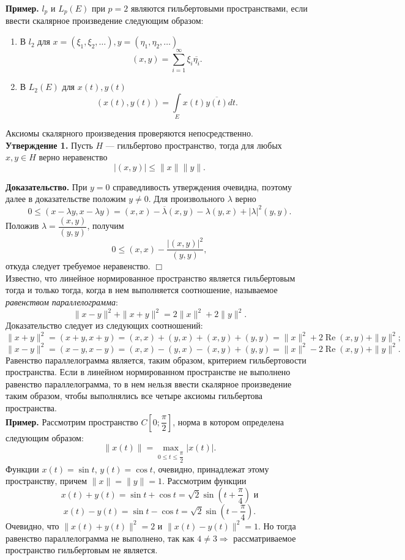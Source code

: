\documentclass[12pt,a4paper, titlepage]{article}
\renewcommand{\Re}{\mathop{\mathrm{Re}}\nolimits}
\begin{document}
\textbf{Пример.} $l_p$ и $L_p(E)$ при $p = 2$ являются гильбертовыми пространствами, если ввести скалярное произведение следующим образом:
	\begin{enumerate}
	\item
	В $l_2$ для $x = (\xi_1, \xi_2, \dots), y = (\eta_1, \eta_2, \dots)$
	$$
	(x, y) = \sum_{i=1}^\infty \xi_i \overline{\eta_i}.
	$$
	\item
	В $L_2(E)$ для $x(t), y(t)$
	$$
	(x(t), y(t)) = \int\limits_E x(t) \overline{y(t)} dt.
	$$
	\end{enumerate}
Аксиомы скалярного произведения проверяются непосредственно.\\

\textbf{Утверждение 1.} Пусть $H$ --- гильбертово пространство, тогда для любых $x, y \in H$ верно неравенство
$$
|(x,y)| \leqslant \|x\| \|y\|.
$$

\textbf{Доказательство.} При $y = 0$ справедливость утверждения очевидна, поэтому далее в доказательстве положим $y \neq 0$. Для произвольного $\lambda$ верно
$$
0 \leqslant (x - \lambda y, x - \lambda y) = (x, x) - \overline{\lambda} (x, y) - \lambda (y, x) + |\lambda |^2 (y, y).
$$ 
Положив $\lambda = \dfrac{(x, y)}{(y, y)}$, получим 
$$
0 \leqslant (x, x) - \frac{|(x, y)|^2}{(y, y)},
$$
откуда следует требуемое неравенство. $\Box$\\

Известно, что линейное нормированное пространство является гильбертовым тогда и только тогда, когда в нем выполняется соотношение, называемое \textit{равенством параллелограмма}:
$$
\|x - y\|^2 + \|x + y\|^2 = 2\|x\|^2 + 2\|y\|^2.
$$
Доказательство следует из следующих соотношений:
$$
\|x+y\|^2 = (x + y, x + y) = (x, x) + (y, x) + (x, y) + (y, y) = \|x\|^2 + 2\Re (x, y) + \|y\|^2;
$$
$$
\|x-y\|^2 = (x - y, x - y) = (x, x) - (y, x) - (x, y) + (y, y) = \|x\|^2 - 2\Re (x, y) + \|y\|^2.
$$
Равенство параллелограмма является, таким образом, критерием гильбертовости пространства. Если в линейном нормированном пространстве не выполнено равенство параллелограмма, то в нем нельзя ввести скалярное произведение таким образом, чтобы выполнялись все четыре аксиомы гильбертова пространства.\\

\textbf{Пример.} Рассмотрим пространство $C \left[0; \dfrac{\pi}{2} \right]$, норма в котором определена следующим образом:
$$
\|x(t)\| = \max_{0 \leqslant t \leqslant \dfrac{\pi}{2}} |x(t)|.
$$
Функции $x(t) = \sin t$, $y(t) = \cos t$, очевидно, принадлежат этому пространству, причем $\|x\| = \|y\| = 1$. Рассмотрим функции
$$
x(t) + y(t) = \sin t + \cos t = \sqrt{2} \sin \left(t + \frac{\pi}{4}\right) \text{ и}
$$
$$
x(t) - y(t) = \sin t - \cos t = \sqrt{2} \sin \left(t - \frac{\pi}{4}\right).
$$
Очевидно, что $\|x(t) + y(t)\|^2 = 2$ и $\|x(t) - y(t)\|^2 = 1$. Но тогда равенство параллелограмма не выполнено, так как $4 \neq 3 \Rightarrow$ рассматриваемое пространство гильбертовым не является.\\
\end{document}
